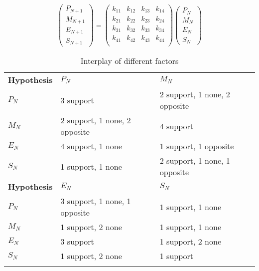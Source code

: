 \documentclass{mcmthesis}
\newlength\savedwidth
\newcommand\whline{\noalign{\global\savedwidth\arrayrulewidth
                            \global\arrayrulewidth 1.2pt}%
                   \hline
                   \noalign{\global\arrayrulewidth\savedwidth}}
\newlength\savewidth
\newcommand\shline{\noalign{\global\savewidth\arrayrulewidth
                            \global\arrayrulewidth 1.2pt}%
                   \hline
                   \noalign{\global\arrayrulewidth\savewidth}}
\begin{document}
$$
\left(
\begin{matrix}
	P_{N+1} \\ M_{N+1} \\ E_{N+1} \\ S_{N+1}
\end{matrix}
\right) 
= 
\left(
\begin{matrix}
k_{11} & k_{12} & k_{13} & k_{14} \\
k_{21} & k_{22} & k_{23} & k_{24} \\
k_{31} & k_{32} & k_{33} & k_{34} \\
k_{41} & k_{42} & k_{43} & k_{44} \\
\end{matrix}
\right) 
\left(
\begin{matrix}
P_N \\ M_N \\ E_N \\ S_N
\end{matrix}
\right) 
$$

\begin{table}[htbp]
	\renewcommand\arraystretch{1.5}
	\footnotesize
	\centering
	\begin{tabular}{m{2.7cm}<{\centering}|m{5cm}<{\centering}|m{5cm}<{\centering}}
		\whline
		\textbf{Hypothesis}&\textbf{$P_N$}&\textbf{$M_N$}\\
		\whline
		\textbf{$P_N$}&3 support &2 support, 1 none, 2 opposite\\

		\textbf{$M_N$}&2 support, 1 none, 2 opposite&4 support\\

		\textbf{$E_N$}&4 support, 1 none&1 support, 1 opposite\\

		\textbf{$S_N$}&1 support, 1 none&2 support, 1 none, 1 opposite\\
		\shline
		\textbf{Hypothesis}&\textbf{$E_N$}&\textbf{$S_N$}\\
		\whline
		\textbf{$P_N$}& 3 support, 1 none, 1 opposite & 1 support, 1 none\\

		\textbf{$M_N$}&1 support, 2 none&1 support, 1 none\\

		\textbf{$E_N$}&3 support&1 support, 2 none\\

		\textbf{$S_N$}&1 support, 2 none&1 support\\
		\shline
	\end{tabular}
	\caption{Interplay of different factors}\label{tab:Interplay of different factors}
\end{table}
\end{document}
